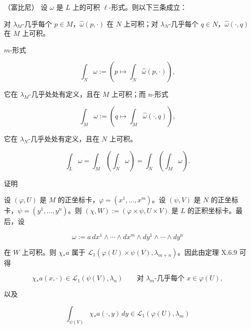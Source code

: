 \begin{theorem}

（富比尼） 设 $ \omega $ 是 $ L $ 上的可积 $ \ell $-形式。则以下三条成立：

\begin{subitems}
\item

对 $ \lambda_M $-几乎每个 $ p \in M $，$ \widehat{\omega}(p,\cdot) $ 在 $ N $ 上可积；对 $ \lambda_N $-几乎每个 $ q \in N $，$ \widehat{\omega}(\cdot,q) $ 在 $ M $ 上可积。

\item

$ m $-形式

\[
\int_N \omega := \left( p \mapsto \int_N \widehat{\omega}(p,\cdot) \right) ,
\]

它在 $ \lambda_M $-几乎处处有定义，且在 $ M $ 上可积；而 $ n $-形式

\[
\int_M \omega := \left( q \mapsto \int_M \widehat{\omega}(\cdot,q) \right) ,
\]

它在 $ \lambda_N $-几乎处处有定义，且在 $ N $ 上可积。

\item
\[
\int_L \omega = \int_M \left( \int_N \omega \right) = \int_N \left( \int_M \omega \right) .
\]
\end{subitems}

证明

\begin{items}
\item

设 $ (\varphi, U) $ 是 $ M $ 的正坐标卡，$ \varphi = (x^1, \dots, x^m) $。设 $ (\psi, V) $ 是 $ N $ 的正坐标卡，$ \psi = (y^1, \dots, y^n) $。则 $ (\chi, W) := (\varphi \times \psi, U \times V) $ 是 $ L $ 的正积坐标卡。最后，设

\[
\omega := a \, dx^1 \wedge \cdots \wedge dx^m \wedge dy^1 \wedge \cdots \wedge dy^n
\]

在 $ W $ 上可积。则 $ \chi_* a $ 属于 $ \mathcal{L}_1(\varphi(U) \times \psi(V), \lambda_{m+n}) $。因此由定理 X.6.9 可得

\begin{equation}
\chi_* a(x, \cdot) \in \mathcal{L}_1(\psi(V), \lambda_n) \qquad \text{对 } \lambda_m\text{-几乎每个 } x \in \varphi(U) ,\tag{2.12}
\end{equation}

以及

\begin{equation}
\int_{\psi(V)} \chi_* a(\cdot, y) \, dy \in \mathcal{L}_1(\varphi(U), \lambda_m)\tag{2.13}
\end{equation}


\end{items}
\end{theorem}
